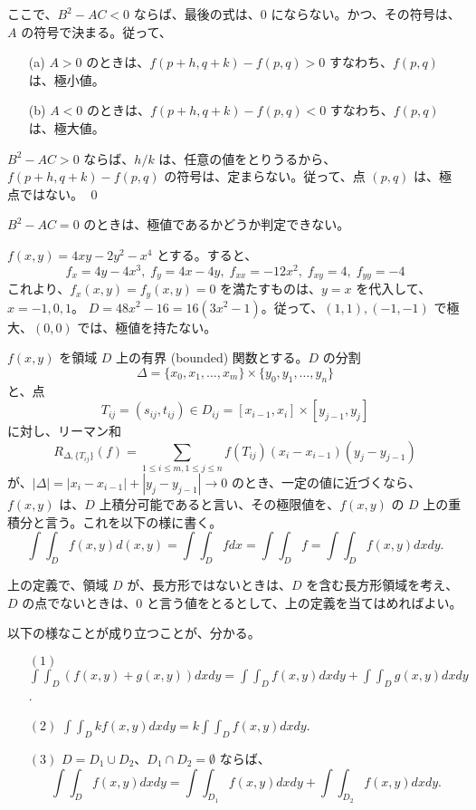 ここで、$B^2 - AC<0$ ならば、最後の式は、$0$ にならない。かつ、その符号は、$A$ の符号で決まる。従って、
\begin{itemize}
\item[(a)] $A>0$ のときは、$f(p+h,q+k) - f(p,q)>0$ すなわち、$f(p,q)$ は、極小値。
\item[(b)] $A<0$ のときは、$f(p+h,q+k) - f(p,q)<0$ すなわち、$f(p,q)$ は、極大値。
\end{itemize}
$B^2 - AC>0$ ならば、$h/k$ は、任意の値をとりうるから、$f(p+h,q+k) - f(p,q)$ の符号は、定まらない。従って、点 $(p,q)$ は、極点ではない。
\qed

\medskip
\note $B^2 -AC = 0$ のときは、極値であるかどうか判定できない。

\begin{eg}
$f(x,y) = 4xy - 2y^2 - x^4$ とする。すると、
$$f_x = 4y - 4x^3,\;f_y = 4x - 4y,\;f_{xx} = -12x^2,\;f_{xy}= 4,\;f_{yy} = -4$$
これより、$f_x(x,y) = f_y(x,y) = 0$ を満たすものは、$y = x$ を代入して、$x = -1,0,1$。
$D = 48x^2 - 16 = 16(3x^2 - 1)$。従って、$(1,1),(-1,-1)$ で極大、$(0,0)$ では、極値を持たない。
\end{eg}

\begin{definition}
$f(x,y)$ を領域 $D$ 上の有界 (bounded) 関数とする。$D$ の分割 
$$\Delta = \{x_0,x_1,\ldots,x_m\}\times \{y_0,y_1,\ldots,y_n\}$$
と、点 
$$T_{ij} = (s_{ij},t_{ij})\in D_{ij} = [x_{i-1},x_i]\times[y_{j-1},y_j]$$
に対し、リーマン和
$$R_{\Delta,\{T_{ij}\}}(f) = \sum_{1\leq i\leq m,1\leq j\leq n}f(T_{ij})(x_i-x_{i-1})(y_j-y_{j-1})$$
が、$|\Delta| = |x_i-x_{i-1}| + |y_j-y_{j-1}| \to 0$ のとき、一定の値に近づくなら、$f(x,y)$ は、$D$ 上積分可能であると言い、その極限値を、$f(x,y)$ の $D$ 上の重積分と言う。これを以下の様に書く。
$$\int\!\!\!\int_Df(x,y)d(x,y) = \int\!\!\!\int_Dfdx = \int\!\!\!\int_D f = \int\!\!\!\int_Df(x,y)dxdy.$$
\end{definition}

上の定義で、領域 $D$ が、長方形ではないときは、$D$ を含む長方形領域を考え、$D$ の点でないときは、$0$ と言う値をとるとして、上の定義を当てはめればよい。

\medskip
以下の様なことが成り立つことが、分かる。

\begin{prop} \label{prop:intint:basic}
\begin{itemize}
\item[$(1)$] ${\displaystyle \int\!\!\!\int_D (f(x,y) + g(x,y))dxdy = \int\!\!\!\int_D f(x,y)dxdy + \int\!\!\!\int_D g(x,y)dxdy}$.
\item[$(2)$] ${\displaystyle \int\!\!\!\int_D kf(x,y)dxdy = k\int\!\!\!\int_D f(x,y)dxdy}$.
\item[$(3)$] $D = D_1\cup D_2$、$D_1\cap D_2 = \emptyset$ ならば、
$$\int\!\!\!\int_D f(x,y)dxdy = \int\!\!\!\int_{D_1} f(x,y)dxdy + \int\!\!\!\int_{D_2} f(x,y)dxdy.$$
\end{itemize}
\end{prop}

